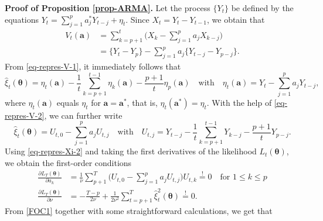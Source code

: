 \documentclass[a4paper,12pt]{article}
\begin{document}
\textbf{Proof of Proposition \ref{prop-ARMA}.}
Let the process $\{Y_t\}$ be defined by the equations $Y_t = \sum_{j=1}^p a_j^* Y_{t-j} + \eta_t$. Since $X_t = Y_t - Y_{t-1}$, we obtain that 
\begin{align}
V_t(\boldsymbol{a}) 
 & = \sum\limits_{k=p+1}^t \Big( X_k - \sum\limits_{j=1}^p a_j X_{k-j} \Big) \label{eq-repres-V-1} \\
 & = \{ Y_t - Y_p \} - \sum\limits_{j=1}^p a_j \{Y_{t-j} - Y_{p-j}\}. \label{eq-repres-V-2}
\end{align} 
From \eqref{eq-repres-V-1}, it immediately follows that 
\begin{equation}\label{eq-repres-Xi-1}
\widehat{\xi}_t(\boldsymbol{\theta}) = \eta_t(\boldsymbol{a}) - \frac{1}{t} \sum\limits_{k=p+1}^{t-1} \eta_k(\boldsymbol{a}) - \frac{p+1}{t} \eta_p(\boldsymbol{a}) \quad \text{with} \quad \eta_t(\boldsymbol{a}) = Y_t - \sum_{j=1}^p a_j Y_{t-j}, 
\end{equation}
where $\eta_t(\boldsymbol{a})$ equals $\eta_t$ for $\boldsymbol{a} = \boldsymbol{a}^*$, that is, $\eta_t(\boldsymbol{a}^*) = \eta_t$. With the help of \eqref{eq-repres-V-2}, we can further write
\begin{equation}\label{eq-repres-Xi-2}
\widehat{\xi}_t(\boldsymbol{\theta}) = U_{t,0} - \sum\limits_{j=1}^p a_j U_{t,j} \quad \text{with} \quad U_{t,j} = Y_{t-j} - \frac{1}{t} \sum\limits_{k=p+1}^{t-1} Y_{k-j} - \frac{p+1}{t} Y_{p-j}. 
\end{equation}
Using \eqref{eq-repres-Xi-2} and taking the first derivatives of the likelihood $L_t(\boldsymbol{\theta})$, we obtain the first-order conditions
\begin{align} 
\frac{\partial L_T(\boldsymbol{\theta})}{\partial a_k} & = \frac{1}{\nu} \sum\limits_{p+1}^T \Big( U_{t,0} - \sum\limits_{j=1}^p a_j U_{t,j} \Big) U_{t,k} \stackrel{!}{=} 0 \quad \text{for } 1 \le k \le p \label{FOC1} \\
\frac{\partial L_T(\boldsymbol{\theta})}{\partial \nu} & = -\frac{T-p}{2\nu} + \frac{1}{2\nu^2} \sum\limits_{t=p+1}^T \widehat{\xi}_t^2(\boldsymbol{\theta}) \stackrel{!}{=} 0. \label{FOC2}  
\end{align}
From \eqref{FOC1} together with some straightforward calculations, we get that 
\end{document}
